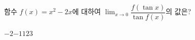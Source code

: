 함수 $f(x)=x^2-2x$에 대하여 $\displaystyle\lim_{x\to 0}\dfrac{f(\tan x)}{\tan f(x)}$의 값은?
\begin{choices32}{$-2$}{$-1$}{$1$}{$2$}{$3$}\end{choices32}
